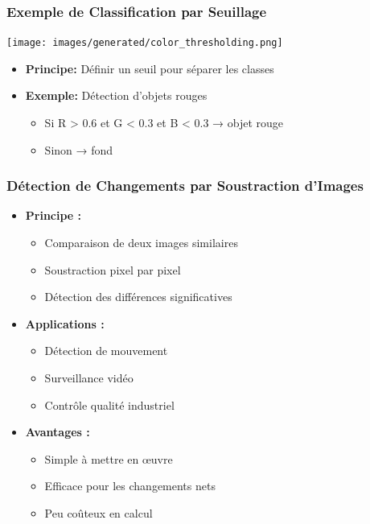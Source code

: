 \documentclass{beamer}
\begin{document}
\begin{frame}
    \frametitle{Exemple de Classification par Seuillage}
    \begin{center}
        \texttt{[image: images/generated/color\_thresholding.png]}
    \end{center}
    \begin{itemize}
        \item \textbf{Principe:} Définir un seuil pour séparer les classes
        \item \textbf{Exemple:} Détection d'objets rouges
        \begin{itemize}
            \item Si R > 0.6 et G < 0.3 et B < 0.3 → objet rouge
            \item Sinon → fond
        \end{itemize}
    \end{itemize}
\end{frame}

\begin{frame}
    \frametitle{Détection de Changements par Soustraction d'Images}
    \begin{itemize}
        \item \textbf{Principe :}
        \begin{itemize}
            \item Comparaison de deux images similaires
            \item Soustraction pixel par pixel
            \item Détection des différences significatives
        \end{itemize}
        \item \textbf{Applications :}
        \begin{itemize}
            \item Détection de mouvement
            \item Surveillance vidéo
            \item Contrôle qualité industriel
        \end{itemize}
        \item \textbf{Avantages :}
        \begin{itemize}
            \item Simple à mettre en œuvre
            \item Efficace pour les changements nets
            \item Peu coûteux en calcul
        \end{itemize}
    \end{itemize}
\end{frame}
\end{document}
